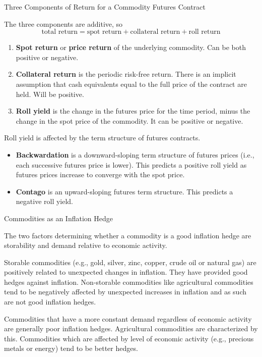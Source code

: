 \documentclass[../custom]{flashcards}
\begin{document}
\begin{flashcard}{Three Components of Return for a Commodity Futures Contract}
    \begin{flushleft}
        The three components are additive, so
        \[
            \text{total return} = \text{spot return} + \text{collateral return} + \text{roll return}
        \]
        \begin{enumerate}
            \item \textbf{Spot return} or \textbf{price return} of the underlying commodity. Can be both positive or negative.
            \item \textbf{Collateral return} is the periodic risk-free return. There is an implicit assumption that cash equivalents equal to the full price of the contract are held. Will be positive.
            \item \textbf{Roll yield} is the change in the futures price for the time period, minus the change in the spot price of the commodity. It can be positive or negative.
        \end{enumerate}
        Roll yield is affected by the term structure of futures contracts.
        \begin{itemize}
            \item \textbf{Backwardation} is a downward-sloping term structure of futures prices (i.e., each successive futures price is lower). This predicts a positive roll yield as futures prices increase to converge with the spot price.
            \item \textbf{Contago} is an upward-sloping futures term structure. This predicts a negative roll yield.
        \end{itemize}
    \end{flushleft}
\end{flashcard}

\begin{flashcard}{Commodities as an Inflation Hedge}
    \begin{flushleft}
        The two factors determining whether a commodity is a good inflation hedge are storability and demand relative to economic activity.\newline

        Storable commodities (e.g., gold, silver, zinc, copper, crude oil or natural gas) are positively related to unexpected changes in inflation. They have provided good hedges against inflation. Non-storable commodities like agricultural commodities tend to be negatively affected by unexpected increases in inflation and as such are not good inflation hedges.\newline

        Commodities that have a more constant demand regardless of economic activity are generally poor inflation hedges. Agricultural commodities are characterized by this. Commodities which are affected by level of economic activity (e.g., precious metals or energy) tend to be better hedges.
    \end{flushleft}
\end{flashcard}
\end{document}
